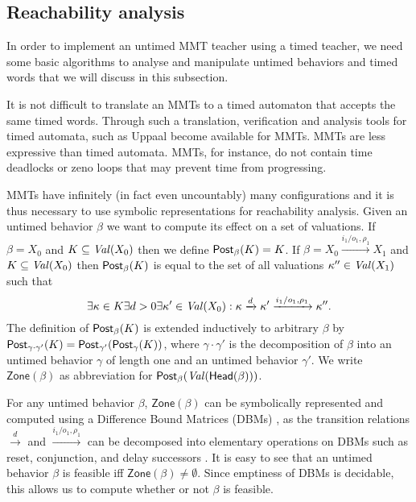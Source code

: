 \newcommand{\Zone}[1]{\mathsf{Zone}({#1})}
\iflong
\subsection{Reachability analysis}

In order to implement an untimed MMT teacher using a timed teacher, we need some basic algorithms to
analyse and manipulate untimed behaviors and timed words that we will discuss in this subsection.

It is not difficult to translate an MMTs to a timed automaton \cite{AD94,BengtssonY03} that accepts the same timed words.
Through such a translation, verification and analysis tools for timed automata, such as Uppaal \cite{Uppaal4.0}
become available for MMTs.
MMTs are less expressive than timed automata. MMTs, for instance, do not contain time deadlocks or zeno loops that
may prevent time from progressing.

MMTs have infinitely (in fact even uncountably) many configurations and it is thus necessary to use symbolic representations
for reachability analysis. Given an untimed behavior $\beta$ we want to compute its effect on a set of valuations. 
If $\beta =X_0$ and $K \subseteq\mathit{Val}({X_0})$ then we define $\mathsf{Post}_{\beta}(K) = K$.
If $\beta = X_0 \xrightarrow{i_1/o_1, \rho_1} X_1$ and
$K \subseteq\mathit{Val}({X_0})$ then $\mathsf{Post}_{\beta}(K)$ is equal to the set of all valuations $\kappa'' \in\mathit{Val}({X_1})$ such that
\[
  \exists \kappa \in K \exists d >0 \exists \kappa' \in\mathit{Val}({X_0}) :
 \kappa \xrightarrow{d} \kappa' \xrightarrow{i_1/o_1, \rho_1} \kappa'' .
\]
The definition of $\mathsf{Post}_{\beta}(K)$ is extended inductively to arbitrary $\beta$ by 
$\mathsf{Post}_{\gamma \cdot \gamma'}(K) = \mathsf{Post}_{\gamma'} (\mathsf{Post}_{\gamma}(K))$, where $\gamma \cdot \gamma'$ is the decomposition of
$\beta$ into an untimed behavior $\gamma$ of length one and an untimed behavior $\gamma'$.
We write $\Zone{\beta}$ as abbreviation for $\mathsf{Post}_{\beta}(\mathit{Val}({\mathsf{Head}({\beta})}))$.

For any untimed behavior $\beta$, $\Zone{\beta}$ can be symbolically represented and computed using a Difference Bound Matrices (DBMs)
 \cite{Di89}, as the transition relations $\xrightarrow{d}$ and $\xrightarrow{i_1/o_1, \rho_1}$ can be decomposed 
into elementary operations on DBMs such as reset, conjunction, and delay successors \cite{BengtssonY03}.
%
It is easy to see that an untimed behavior $\beta$ is feasible iff $\Zone{\beta} \neq \emptyset$.
Since emptiness of DBMs is decidable, this allows us to compute whether or not $\beta$ is feasible.

